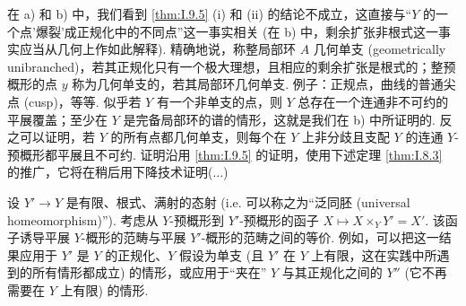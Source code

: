 在 a) 和 b) 中，我们看到 \ref{thm:I.9.5} (i) 和 (ii) 的结论不成立，这直接与``$Y$ 的一个点'爆裂'成正规化中的不同点''这一事实相关 (在 b) 中，剩余扩张非根式这一事实应当从几何上作如此解释). 精确地说，称整局部环 $A$ 几何单支 (geometrically unibranched)，若其正规化只有一个极大理想，且相应的剩余扩张是根式的；整预概形的点 $y$ 称为几何单支的，若其局部环几何单支. 例子：正规点，曲线的普通尖点 (cusp)，等等. 似乎若 $Y$ 有一个非单支的点，则 $Y$ 总存在一个连通非不可约的平展覆盖；至少在 $Y$ 是完备局部环的谱的情形，这就是我们在 b) 中所证明的. 反之可以证明，若 $Y$ 的所有点都几何单支，则每个在 $Y$ 上非分歧且支配 $Y$ 的连通 $Y$-预概形都平展且不可约. 证明沿用 \ref{thm:I.9.5} 的证明，使用下述定理 \ref{thm:I.8.3} 的推广，它将在稍后用下降技术证明(...)

设 $Y' \to Y$ 是有限、根式、满射的态射 (i.e. 可以称之为``泛同胚 (universal homeomorphism)''). 考虑从 $Y$-预概形到 $Y'$-预概形的函子 $X \mapsto X \times_Y Y' = X'$. 该函子诱导平展 $Y$-概形的范畴与平展 $Y'$-概形的范畴之间的等价. 例如，可以把这一结果应用于 $Y'$ 是 $Y$ 的正规化、$Y$ 假设为单支 (且 $Y'$ 在 $Y$ 上有限，这在实践中所遇到的所有情形都成立) 的情形，或应用于``夹在'' $Y$ 与其正规化之间的 $Y''$ (它不再需要在 $Y$ 上有限) 的情形.


